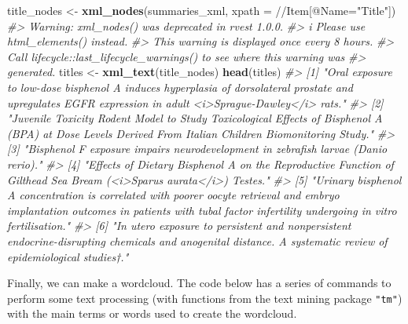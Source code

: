 \documentclass[
]{book}
\newenvironment{Shaded}{\begin{snugshade}}{\end{snugshade}}
\newcommand{\AttributeTok}[1]{\textcolor[rgb]{0.13,0.29,0.53}{#1}}
\newcommand{\CommentTok}[1]{\textcolor[rgb]{0.56,0.35,0.01}{\textit{#1}}}
\newcommand{\FunctionTok}[1]{\textcolor[rgb]{0.13,0.29,0.53}{\textbf{#1}}}
\newcommand{\NormalTok}[1]{#1}
\newcommand{\OtherTok}[1]{\textcolor[rgb]{0.56,0.35,0.01}{#1}}
\newcommand{\StringTok}[1]{\textcolor[rgb]{0.31,0.60,0.02}{#1}}
\begin{document}
\begin{Shaded}
\begin{Highlighting}[]
\NormalTok{title\_nodes }\OtherTok{\textless{}{-}} \FunctionTok{xml\_nodes}\NormalTok{(summaries\_xml, }\AttributeTok{xpath =} \StringTok{\textquotesingle{}//Item[@Name="Title"]\textquotesingle{}}\NormalTok{)}
\CommentTok{\#\textgreater{} Warning: \textasciigrave{}xml\_nodes()\textasciigrave{} was deprecated in rvest 1.0.0.}
\CommentTok{\#\textgreater{} i Please use \textasciigrave{}html\_elements()\textasciigrave{} instead.}
\CommentTok{\#\textgreater{} This warning is displayed once every 8 hours.}
\CommentTok{\#\textgreater{} Call \textasciigrave{}lifecycle::last\_lifecycle\_warnings()\textasciigrave{} to see where this warning was}
\CommentTok{\#\textgreater{} generated.}
\NormalTok{titles }\OtherTok{\textless{}{-}} \FunctionTok{xml\_text}\NormalTok{(title\_nodes)}
\FunctionTok{head}\NormalTok{(titles)}
\CommentTok{\#\textgreater{} [1] "Oral exposure to low{-}dose bisphenol A induces hyperplasia of dorsolateral prostate and upregulates EGFR expression in adult \textless{}i\textgreater{}Sprague{-}Dawley\textless{}/i\textgreater{} rats."                                   }
\CommentTok{\#\textgreater{} [2] "Juvenile Toxicity Rodent Model to Study Toxicological Effects of Bisphenol A (BPA) at Dose Levels Derived From Italian Children Biomonitoring Study."                                      }
\CommentTok{\#\textgreater{} [3] "Bisphenol F exposure impairs neurodevelopment in zebrafish larvae (Danio rerio)."                                                                                                          }
\CommentTok{\#\textgreater{} [4] "Effects of Dietary Bisphenol A on the Reproductive Function of Gilthead Sea Bream (\textless{}i\textgreater{}Sparus aurata\textless{}/i\textgreater{}) Testes."                                                                          }
\CommentTok{\#\textgreater{} [5] "Urinary bisphenol A concentration is correlated with poorer oocyte retrieval and embryo implantation outcomes in patients with tubal factor infertility undergoing in vitro fertilisation."}
\CommentTok{\#\textgreater{} [6] "In utero exposure to persistent and nonpersistent endocrine{-}disrupting chemicals and anogenital distance. A systematic review of epidemiological studies†."}
\end{Highlighting}
\end{Shaded}

Finally, we can make a wordcloud.
The code below has a series of commands to perform some text processing
(with functions from the text mining package \texttt{"tm"}) with the main terms
or words used to create the wordcloud.
\end{document}
